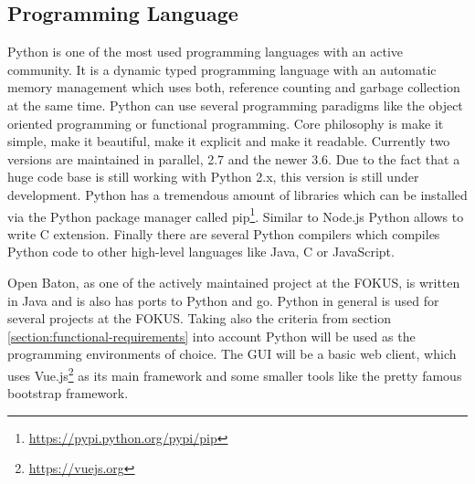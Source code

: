 \subsection{Programming Language}
Python is one of the most used programming languages with an active community.\autocite[cf.]{ProgramminLanguage:2017}
It is a dynamic typed programming language with an automatic memory management which uses both, reference counting and garbage collection at the same time.\autocite[cf.]{Python:GarbageCollection}
Python can use several programming paradigms like the object oriented programming or functional programming.
Core philosophy is make it simple, make it beautiful, make it explicit and make it readable.
Currently two versions are maintained in parallel, 2.7 and the newer 3.6.
Due to the fact that a huge code base is still working with Python 2.x, this version is still under development.\autocite[cf.]{Peterson:PythonReleaseSchedule}
Python has a tremendous amount of libraries which can be installed via the Python package manager called pip\footnote{\url{https://pypi.python.org/pypi/pip}}.
Similar to Node.js Python allows to write C extension.
Finally there are several Python compilers which compiles Python code to other high-level languages like Java, C or JavaScript.


Open Baton, as one of the actively maintained project at the \ac{FOKUS}, is written in Java and is also has ports to Python and go.
Python in general is used for several projects at the \ac{FOKUS}.
Taking also the criteria from section \ref{section:functional-requirements} into account Python will be used as the  programming environments of choice.
The \ac{GUI} will be a basic web client, which uses Vue.js\footnote{\url{https://vuejs.org}} as its main framework and some smaller tools like the pretty famous bootstrap framework.

